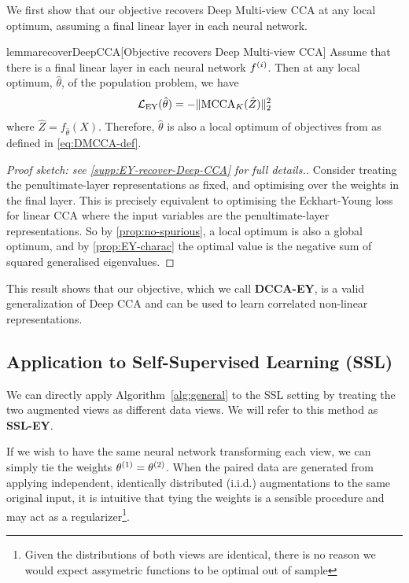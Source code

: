 We first show that our objective recovers Deep Multi-view CCA at any local optimum, assuming a final linear layer in each neural network.

\begin{restatable}{lemma}{recoverDeepCCA}[Objective recovers Deep Multi-view CCA]\label{lem:recover-DeepCCA}
Assume that there is a final linear layer in each neural network $f^{(i)}$.
Then at any local optimum, $\hat{\theta}$, of the population problem, we have
\begin{align*}
\mathcal{L}_\text{EY}(\hat{\theta}) = - \lVert\operatorname{MCCA}_K(\hat{Z})\rVert_2^2
\end{align*}
where $\hat{Z} = f_{\hat{\theta}}(X)$.
Therefore, $\hat{\theta}$ is also a local optimum of objectives from \citet{andrew2013deep, somandepalli2019multimodal} as defined in \cref{eq:DMCCA-def}.
\end{restatable}

\begin{proof}[Proof sketch: see \cref{supp:EY-recover-Deep-CCA} for full details.]
Consider treating the penultimate-layer representations as fixed, and optimising over the weights in the final layer.
This is precisely equivalent to optimising the Eckhart-Young loss for linear CCA where the input variables are the penultimate-layer representations.
So by \cref{prop:no-spurious}, a local optimum is also a global optimum, and by \cref{prop:EY-charac} the optimal value is the negative sum of squared generalised eigenvalues.
\end{proof}

This result shows that our objective, which we call \textbf{DCCA-EY}, is a valid generalization of Deep CCA and can be used to learn correlated non-linear representations.

\subsection{Application to Self-Supervised Learning (SSL)}

We can directly apply Algorithm~\ref{alg:general} to the SSL setting by treating the two augmented views as different data views. We will refer to this method as \textbf{SSL-EY}.

If we wish to have the same neural network transforming each view, we can simply tie the weights $\theta^{(1)} = \theta^{(2)}$. When the paired data are generated from applying independent, identically distributed (i.i.d.) augmentations to the same original input, it is intuitive that tying the weights is a sensible procedure and may act as a regularizer\footnote{Given the distributions of both views are identical, there is no reason we would expect assymetric functions to be optimal out of sample}.

